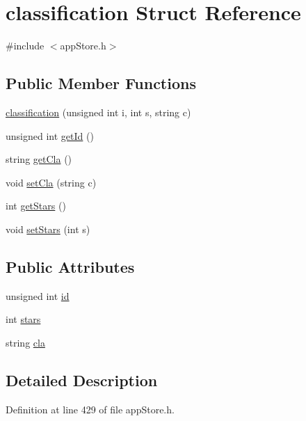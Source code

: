 \hypertarget{structclassification}{\section{classification Struct Reference}
\label{structclassification}
}


{\ttfamily \#include $<$app\-Store.\-h$>$}

\subsection*{Public Member Functions}
\begin{DoxyCompactItemize}
\item 
\hyperlink{structclassification_a37c9ab07d44dd2848cd56fb295a073cc}{classification} (unsigned int i, int s, string c)
\item 
unsigned int \hyperlink{structclassification_ac697501ad9f9f42fe94f5f7c6cba5bc0}{get\-Id} ()
\item 
string \hyperlink{structclassification_a329928996fee024d2f8b46700006b549}{get\-Cla} ()
\item 
void \hyperlink{structclassification_a218dd647d1c2f6aab44fbf72e3315bc8}{set\-Cla} (string c)
\item 
int \hyperlink{structclassification_a7f1447778e349048384787d144f69b1a}{get\-Stars} ()
\item 
void \hyperlink{structclassification_accd9d95c9b46ae4812819a644acb3cde}{set\-Stars} (int s)
\end{DoxyCompactItemize}
\subsection*{Public Attributes}
\begin{DoxyCompactItemize}
\item 
unsigned int \hyperlink{structclassification_ae462b5f31b8cd7db4f3dc33e6108281e}{id}
\item 
int \hyperlink{structclassification_aa4513b5df07d85abafaf2e4ad1ea05a3}{stars}
\item 
string \hyperlink{structclassification_a59ef7a4350833893b455fe68bf3d338e}{cla}
\end{DoxyCompactItemize}


\subsection{Detailed Description}


Definition at line 429 of file app\-Store.\-h.



